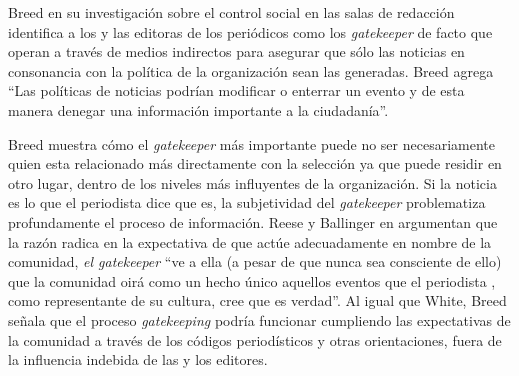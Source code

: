  Breed en su investigación sobre el control social en las salas de redacción \cite{breed1955social} identifica a los y las editoras de los periódicos como los \emph{gatekeeper} de facto que operan a través de medios indirectos para asegurar que sólo las noticias en consonancia con la política de la organización sean las generadas. Breed agrega ``Las políticas de noticias podrían modificar o enterrar un evento y de esta manera denegar una información importante a la ciudadanía''.


Breed muestra cómo el \emph{gatekeeper} más importante puede no ser necesariamente quien esta relacionado más directamente con la selección ya que puede residir en otro lugar, dentro de los niveles más influyentes de la organización. Si la noticia es lo que el periodista dice que es, la subjetividad del \emph{gatekeeper} problematiza profundamente el proceso de información. Reese y Ballinger en \cite{13213947} argumentan que la razón radica en la expectativa de que actúe adecuadamente en nombre de la comunidad, \emph{el gatekeeper} ``ve a ella (a pesar de que nunca sea consciente de ello) que la comunidad oirá como un hecho único aquellos eventos que el periodista , como representante de su cultura, cree que es verdad''. Al igual que White, Breed señala que el proceso \emph{gatekeeping} podría funcionar cumpliendo las expectativas de la comunidad a través de los códigos periodísticos y otras orientaciones, fuera de la influencia indebida de las y los editores. 


